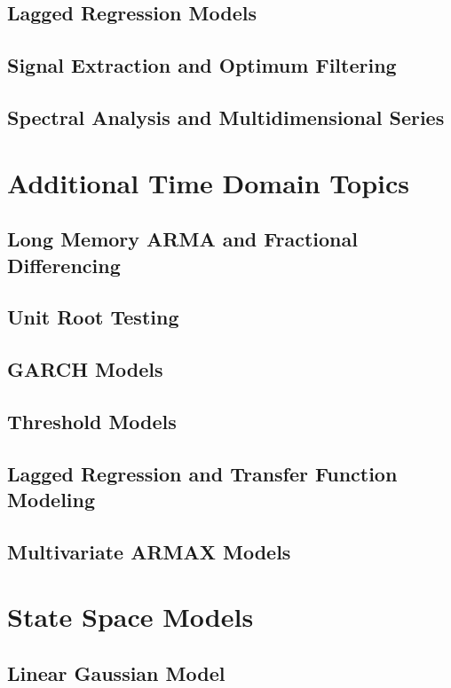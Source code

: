 \documentclass[12pt]{article}
\begin{document}
\subsection{Lagged Regression Models}

\subsection{Signal Extraction and Optimum Filtering}

\subsection{Spectral Analysis and Multidimensional Series}


\section{Additional Time Domain Topics}
\subsection{Long Memory ARMA and Fractional Differencing}

\subsection{Unit Root Testing}

\subsection{GARCH Models}

\subsection{Threshold Models}

\subsection{Lagged Regression and Transfer Function Modeling}

\subsection{Multivariate ARMAX Models}


\section{State Space Models}
\subsection{Linear Gaussian Model}
\end{document}
